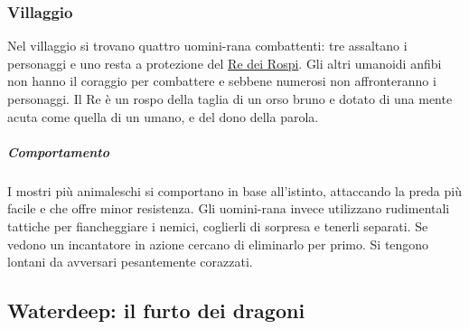 \documentclass{article}
\begin{document}
\subsubsection{Villaggio}
Nel villaggio si trovano quattro uomini-rana combattenti: tre assaltano i personaggi e uno resta a protezione del \hyperlink{re}{Re dei Rospi}. Gli altri umanoidi anfibi non hanno il coraggio per combattere e sebbene numerosi non affronteranno i personaggi. Il Re è un rospo della taglia di un orso bruno e dotato di una mente acuta come quella di un umano, e del dono della parola.
\subparagraph{Comportamento}
I mostri più animaleschi si comportano in base all’istinto, attaccando la preda più facile e che offre minor resistenza. Gli uomini-rana invece utilizzano rudimentali tattiche per fiancheggiare i nemici, coglierli di sorpresa e tenerli separati. Se vedono un incantatore in azione cercano di eliminarlo per primo. Si tengono lontani da avversari pesantemente corazzati.





\subsection{Waterdeep: il furto dei dragoni}
\end{document}
